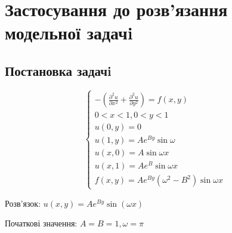 \chapter{Застосування до розв’язання модельної задачi}

\section{Постановка задачi}

\begin{equation}
    \begin{cases}
        - (\frac{\partial^2 u}{\partial x ^ 2} + \frac{\partial ^2 u}{\partial y^2}) = f(x,y) \\
        0 < x < 1, 0 < y < 1 \\
        u(0,y) = 0 \\
        u(1,y) = A e^{By}\sin \omega \\
        u(x,0) = A \sin \omega x \\
        u(x,1) = A e^B \sin \omega x \\
        f(x,y) = A e^{By} (\omega^2 - B^2)\sin \omega x
    \end{cases}
\end{equation}


Розв'язок: $u(x, y) = A e^{By}\sin(\omega x)$


Початкові значення: $A=B=1, \omega = \pi$